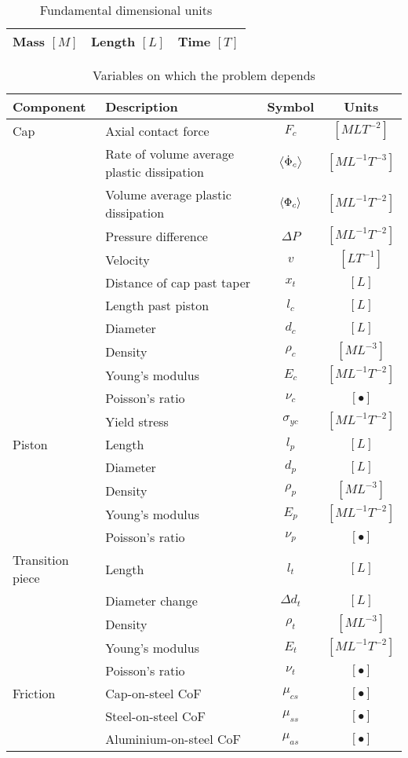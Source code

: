 \documentclass{article}
\begin{document}
\begin{table}[!htb]
	\centering
	\caption{Fundamental dimensional units}
	\label{tab:dimentional-units}
	\begin{tabular}{c c c}
		\hline\hline
		Mass $[M]$ & Length $[L]$ & Time $[T]$\\
		\hline\hline
	\end{tabular}
\end{table}

\begin{table}[!htb]
	\centering
	\caption{Variables on which the problem depends }
	\label{tab:dimentional units}
	\begin{tabular}{l p{7cm} c c}
		\hline
		Component & Description & Symbol & Units \\
		\hline \hline
		Cap & Axial contact force & $F_{c}$ & $[MLT^{-2}]$ \\
		&Rate of volume average plastic dissipation & $\left<\dot{\Phi}_{c}\right>$ & $[ML^{-1}T^{-3}]$\\
		&Volume average plastic dissipation & $\left<\Phi_{c}\right>$ & $[ML^{-1}T^{-2}]$\\
		& Pressure difference & $\Delta P$ & $[ML^{-1}T^{-2}]$\\
		& Velocity & $v$ & $[LT^{-1}]$\\
		&Distance of cap past taper & $x_{t}$ & $[L]$\\
		&Length past piston & $l_{c}$ & $[L]$\\
		&Diameter & $d_{c}$ & $[L]$\\
		&Density & $\rho_{c}$ & $[ML^{-3}]$\\
		&Young's modulus & $E_{c}$ & $[ML^{-1}T^{-2}]$\\
		&Poisson's ratio & $\nu_{c}$ & $[\bullet]$\\
		&Yield stress & $\sigma_{yc}$ & $[ML^{-1}T^{-2}]$\\
		\hline
		Piston&Length & $l_{p}$ & $[L]$\\
		&Diameter & $d_{p}$ & $[L]$\\
		&Density & $\rho_{p}$ & $[ML^{-3}]$\\
		&Young's modulus & $E_{p}$ & $[ML^{-1}T^{-2}]$\\
		&Poisson's ratio & $\nu_{p}$ & $[\bullet]$\\
		\hline
		Transition piece& Length & $l_{t}$ & $[L]$\\
		& Diameter change & $\Delta d_{t}$ & $[L]$\\
		&Density & $\rho_{t}$ & $[ML^{-3}]$\\
		&Young's modulus & $E_{t}$ & $[ML^{-1}T^{-2}]$\\
		&Poisson's ratio & $\nu_{t}$ & $[\bullet]$\\
		\hline
		Friction & Cap-on-steel CoF & $\mu_{cs}$ & $[\bullet]$\\	
		&Steel-on-steel CoF & $\mu_{ss}$ & $[\bullet]$\\
		&Aluminium-on-steel CoF & $\mu_{as}$ & $[\bullet]$\\	
	\end{tabular}
\end{table}
\end{document}
